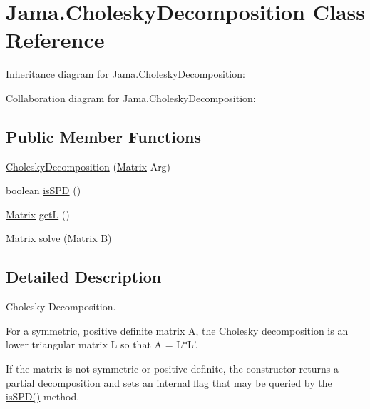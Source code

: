 \hypertarget{class_jama_1_1_cholesky_decomposition}{\section{Jama.\+Cholesky\+Decomposition Class Reference}
\label{class_jama_1_1_cholesky_decomposition}
}


Inheritance diagram for Jama.\+Cholesky\+Decomposition\+:


Collaboration diagram for Jama.\+Cholesky\+Decomposition\+:
\subsection*{Public Member Functions}
\begin{DoxyCompactItemize}
\item 
\hyperlink{class_jama_1_1_cholesky_decomposition_a315b88758566a9852579b5138b7386f2}{Cholesky\+Decomposition} (\hyperlink{class_jama_1_1_matrix}{Matrix} Arg)
\item 
boolean \hyperlink{class_jama_1_1_cholesky_decomposition_ad84aa22ce8f3e9646d7c5e932b6d28d8}{is\+S\+P\+D} ()
\item 
\hyperlink{class_jama_1_1_matrix}{Matrix} \hyperlink{class_jama_1_1_cholesky_decomposition_adcf74030c9514f8f3037a2f373f8bf8d}{get\+L} ()
\item 
\hyperlink{class_jama_1_1_matrix}{Matrix} \hyperlink{class_jama_1_1_cholesky_decomposition_a03d6cb90abf3e377867e6d7758a00521}{solve} (\hyperlink{class_jama_1_1_matrix}{Matrix} B)
\end{DoxyCompactItemize}


\subsection{Detailed Description}
Cholesky Decomposition. 

For a symmetric, positive definite matrix A, the Cholesky decomposition is an lower triangular matrix L so that A = L$\ast$\+L'. 

If the matrix is not symmetric or positive definite, the constructor returns a partial decomposition and sets an internal flag that may be queried by the \hyperlink{class_jama_1_1_cholesky_decomposition_ad84aa22ce8f3e9646d7c5e932b6d28d8}{is\+S\+P\+D()} method. 

